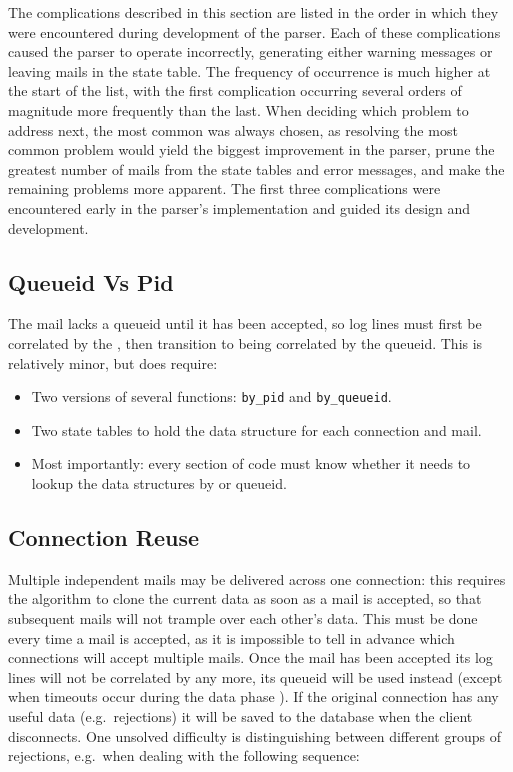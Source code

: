 The complications described in this section are listed in the order in
which they were encountered during development of the parser.  Each of
these complications caused the parser to operate incorrectly, generating
either warning messages or leaving mails in the state table.  The frequency
of occurrence is much higher at the start of the list, with the first
complication occurring several orders of magnitude more frequently than the
last.  When deciding which problem to address next, the most common was
always chosen, as resolving the most common problem would yield the biggest
improvement in the parser, prune the greatest number of mails from the
state tables and error messages, and make the remaining problems more
apparent.  The first three complications were encountered early in the
parser's implementation and guided its design and development.

\subsection{Queueid Vs Pid}

The mail lacks a queueid until it has been accepted, so log lines must
first be correlated by the  , then transition to
being correlated by the queueid.  This is relatively minor, but does
require:

\begin{itemize}

    \item Two versions of several functions: \texttt{by\_pid} and
        \texttt{by\_queueid}.

    \item Two state tables to hold the data structure for each connection
        and mail.

    \item Most importantly: every section of code must know whether it
        needs to lookup the data structures by  or queueid.

\end{itemize}

\subsection{Connection Reuse}

\label{connection reuse}

Multiple independent mails may be delivered across one connection: this
requires the algorithm to clone the current data as soon as a mail is
accepted, so that subsequent mails will not trample over each other's data.
This must be done every time a mail is accepted, as it is impossible to
tell in advance which connections will accept multiple mails.  Once the
mail has been accepted its log lines will not be correlated by
 any more, its queueid will be used instead (except when
timeouts occur during the data phase ).  If the original connection has any useful data (e.g.\ rejections)
it will be saved to the database when the client disconnects.  One unsolved
difficulty is distinguishing between different groups of rejections, e.g.\
when dealing with the following sequence:

